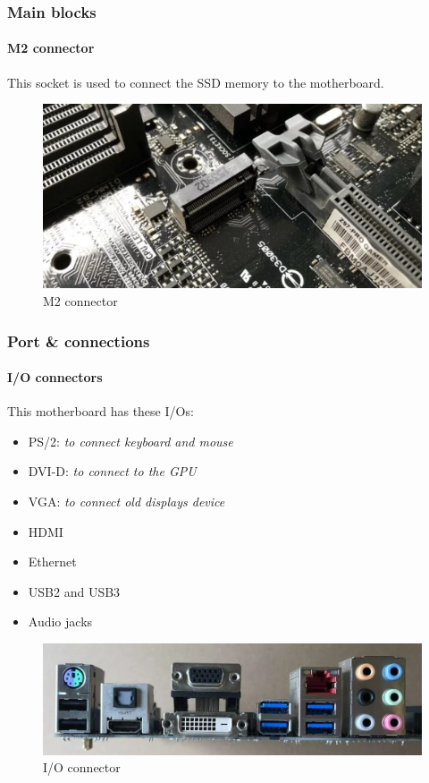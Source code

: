 \documentclass[
	12pt, %
]{beamer}
\begin{document}
\begin{frame}
	\frametitle{Main blocks}
	\framesubtitle{M2 connector}
	
	This socket is used to connect the SSD memory to the motherboard.
	
	\begin{figure}
		\centering
		\includegraphics[width=0.8\linewidth]{Images/img7.jpg}
		\caption{M2 connector}
		\label{M2 connector}
	\end{figure}
\end{frame}




\begin{frame}
	\frametitle{Port \& connections}
	\framesubtitle{I/O connectors}
	
	This motherboard has these I/Os:
	\begin{itemize}
		\item PS/2: \textit{to connect keyboard and mouse}
		\item DVI-D: \textit{to connect to the GPU}
		\item VGA: \textit{to connect old displays device}
		\item HDMI
		\item Ethernet
		\item USB2 and USB3
		\item Audio jacks
	\end{itemize}
	
	\begin{figure}
		\centering
		\includegraphics[width=0.6\linewidth]{Images/img6.jpg}
		\caption{I/O connector}
		\label{I/O connector}
	\end{figure}
\end{frame}
\end{document}

